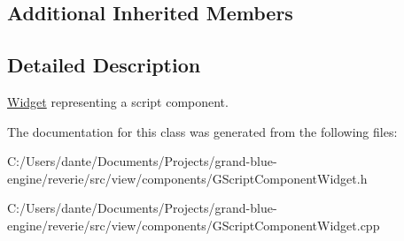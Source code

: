 \subsection*{Additional Inherited Members}


\subsection{Detailed Description}
\mbox{\hyperlink{class_widget}{Widget}} representing a script component. 

The documentation for this class was generated from the following files\+:\begin{DoxyCompactItemize}
\item 
C\+:/\+Users/dante/\+Documents/\+Projects/grand-\/blue-\/engine/reverie/src/view/components/G\+Script\+Component\+Widget.\+h\item 
C\+:/\+Users/dante/\+Documents/\+Projects/grand-\/blue-\/engine/reverie/src/view/components/G\+Script\+Component\+Widget.\+cpp\end{DoxyCompactItemize}
